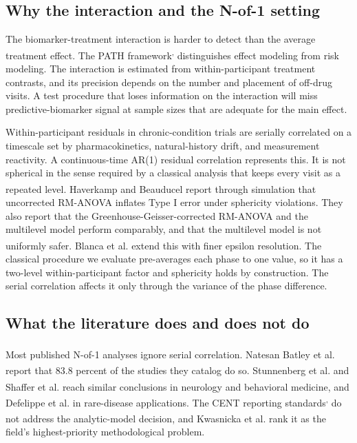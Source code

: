 \documentclass[
  11pt,
]{article}
\begin{document}
\subsection{Why the interaction and the N-of-1 setting}\label{why-the-interaction-and-the-n-of-1-setting}

The biomarker-treatment interaction is harder to detect than the
average treatment effect. The PATH framework\textsuperscript{,} distinguishes effect modeling from risk modeling.
The interaction is estimated from within-participant treatment
contrasts, and its precision depends on the number and placement of
off-drug visits. A test procedure that loses information on the
interaction will miss predictive-biomarker signal at sample sizes
that are adequate for the main effect.

Within-participant residuals in chronic-condition trials are
serially correlated on a timescale set by pharmacokinetics,
natural-history drift, and measurement reactivity. A continuous-time
AR(1) residual correlation represents this. It is not spherical in
the sense required by a classical analysis that keeps every visit
as a repeated level. Haverkamp and Beauducel\textsuperscript{} report through
simulation that uncorrected RM-ANOVA inflates Type I error under
sphericity violations. They also report that the
Greenhouse-Geisser-corrected RM-ANOVA and the multilevel model
perform comparably, and that the multilevel model is not uniformly
safer. Blanca et al.\textsuperscript{} extend this with finer epsilon
resolution. The classical procedure we evaluate pre-averages each
phase to one value, so it has a two-level within-participant factor
and sphericity holds by construction. The serial correlation
affects it only through the variance of the phase difference.

\subsection{What the literature does and does not do}\label{what-the-literature-does-and-does-not-do}

Most published N-of-1 analyses ignore serial correlation.
Natesan Batley et al.\textsuperscript{} report that 83.8 percent of the studies they
catalog do so. Stunnenberg et al.\textsuperscript{} and Shaffer et al.\textsuperscript{} reach similar
conclusions in neurology and behavioral medicine, and
Defelippe et al.\textsuperscript{} in rare-disease applications. The CENT
reporting standards\textsuperscript{,} do not address the analytic-model decision, and
Kwasnicka et al.\textsuperscript{} rank it as the field's highest-priority
methodological problem.
\end{document}
